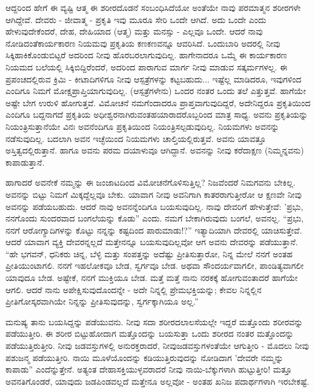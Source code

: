 ಆದ್ದರಿಂದ ಹೇಗೆ ಈ ವ್ಯಷ್ಟಿ ಆತ್ಮ ಈ ಶರೀರದೊಡನೆ ಸಂಬಂಧಿಸಿದೆಯೋ ಅಂತೆಯೇ ನಾವು ಪರಮಾತ್ಮನ ಶರೀರಗಳೇ ಆಗಿದ್ದೇವೆ. ದೇವರು - ಜೀವಾತ್ಮ - ಪ್ರಕೃತಿ ಇವು ಮೂರೂ ಸೇರಿ ಒಂದೇ ಆಗಿದೆ. ಅದು ಒಂದೇ ಎಂದು ಹೇಳುವುದೇಕೆಂದರೆ, ದೇಹ, ದೇಹಿಯಾದ (ಆತ್ಮ) ಮತ್ತು ಮನಸ್ಸು - ಎಲ್ಲವೂ ಒಂದೇ. ಆದರೆ ನಾವು ನೋಡಿದಂತೆ\break ಕಾರ್ಯಕಾರಣ ನಿಯಮವು ಪ್ರಕೃತಿಯ ಕಣಕಣವನ್ನೂ ಆವರಿಸಿದೆ. ಒಂದುಬಾರಿ ಅದರಲ್ಲಿ ನೀವು ಸಿಕ್ಕಿಹಾಕಿಕೊಂಡುಬಿಟ್ಟರೆ ಅದರಿಂದ ನೀವು ಹೊರಬರಲಾಗುವುದಿಲ್ಲ. ಹಾಗೇನಾದರೂ ಒಮ್ಮೆ ಈ ಕಾರ್ಯಕಾರಣ ನಿಯಮದ ಬಲೆಯಲ್ಲಿ ಸಿಕ್ಕಿಬಿದ್ದಿರೆಂದರೆ, ಅದರಿಂದ ಪಾರಾಗುವ ಮಾರ್ಗ ನೀವು ಮಾಡುವ ಸತ್ಕರ್ಮಗಳಲ್ಲ. ಈ ಪ್ರಪಂಚದಲ್ಲಿರುವ ಕ್ರಿಮಿ - ಕೀಟಾದಿಗಳಿಗೂ ನೀವು ಆಸ್ಪತ್ರೆಗಳನ್ನು ಕಟ್ಟಬಹುದು... ಇಷ್ಟೆಲ್ಲ ಮಾಡಿದರೂ, ಇವುಗಳಿಂದ ಎಂದಿಗೂ ನಿಮಗೆ ಮೋಕ್ಷಪ್ರಾಪ್ತಿಯಾಗುವುದಿಲ್ಲ. (ಆಸ್ಪತ್ರೆಗಳೇನು) ಒಂದರ ನಂತರ ಒಂದು ತಲೆ ಎತ್ತುತ್ತವೆ. ಹಾಗೆಯೇ ಅಷ್ಟೇ ಬೇಗ ಉರುಳಿ ಹೋಗುತ್ತವೆ. ವಿಮೋಚನೆ ನಮಗೆಂದಾದರೂ ಪ್ರಾಪ್ತವಾಗುವುದಿದ್ದರೆ, ಅದೇನಿದ್ದರೂ ಪ್ರಕೃತಿಯಿಂದ ಎಂದಿಗೂ ಬದ್ದನಾಗದೆ ಪ್ರಕೃತಿಯ ಅಧೀಶ್ವರನಾಗಿರುವಂತಹ\break ಯಾರಾದರೊಬ್ಬರಿಂದ ಮಾತ್ರ ಸಾಧ್ಯ. ಅವನು ಪ್ರಕೃತಿಯನ್ನು ನಿಯಂತ್ರಿಸುತ್ತಾನೆಯೇ ವಿನಃ ಅವನೆಂದಿಗೂ ಪ್ರಕೃತಿಯಿಂದ ನಿಯಂತ್ರಿಸಲ್ಪಡುವುದಿಲ್ಲ. ನಿಯಮಗಳು ಅವನನ್ನು ನಡೆಸುವುದಿಲ್ಲ. ಬದಲಾಗಿ ಅವನ ಇಚ್ಛೆಯಿಂದ ನಿಯಮಗಳು ಚಾಲ್ತಿಯಲ್ಲಿರುತ್ತವೆ. ಅವನು ಯಾವತ್ತೂ ಅಸ್ತಿತ್ವದಲ್ಲಿರುತ್ತಾನೆ. ಹಾಗೂ ಅವನು ಪರಮ ದಯಾಳುವೂ ಆಗಿದ್ದಾನೆ. ಅವನನ್ನು ನೀವು ಕರೆದಾಕ್ಷಣ (ನಿಮ್ಮನ್ನವನು) ಕಾಪಾಡುತ್ತಾನೆ.

ಹಾಗಾದರೆ ಅವನೇಕೆ ನಮ್ಮನ್ನು ಈ ಜಂಜಾಟದಿಂದ ವಿಮೋಚನೆಗೊಳಿಸುತ್ತಿಲ್ಲ? ನಿಜವೆಂದರೆ ನಿಮಗವನು ಬೇಕಿಲ್ಲ. ಅವನನ್ನು ಬಿಟ್ಟು ನಿಮಗೆ ಮಿಕ್ಕದ್ದೆಲ್ಲವೂ ಬೇಕು. ಯಾವಾಗ ನೀವು ಅವನಿಗಾಗಿ ಕಾತರರಾಗುತ್ತೀರೋ ಆ ಕ್ಷಣವೇ ನೀವು ಅವನನ್ನು ಪಡೆಯಬಹುದು. ಆದರೆ ನಾವು ಅವನನ್ನೆಂದಿಗೂ ಬಯಸುವುದಿಲ್ಲ. ನಾವು ದೇವರಿಗೆ ಹೇಳುತ್ತೇವೆ: 'ಪ್ರಭು, ನನಗೊಂದು ಸುಂದರವಾದ ಬಂಗಲೆಯನ್ನು ಕೊಡು” ಎಂದು. ನಮಗೆ ಬೇಕಾಗಿರುವುದು ಬಂಗಲೆ, ಅವನಲ್ಲ. “ಪ್ರಭು, ನನಗೆ ಆರೋಗ್ಯಾದಿಗಳನ್ನು ಕೊಟ್ಟು ನನ್ನನ್ನು ಕಷ್ಟದಿಂದ ಪಾರುಮಾಡು!?” ಇತ್ಯಾದಿಯಾಗಿ ದೇವರಲ್ಲಿ ಯಾಚಿಸುತ್ತೇವೆ. ಆದರೆ ಯಾವಾಗ ವ್ಯಕ್ತಿ ದೇವರನ್ನಲ್ಲದೆ ಮತ್ತೇನನ್ನೂ ಬಯಸುವುದಿಲ್ಲವೋ ಆಗ ಅವನು ದೇವರನ್ನು ಪಡೆಯುತ್ತಾನೆ. “ಹೇ ಭಗವನ್, ಧನಿಕರು ಚಿನ್ನ, ಬೆಳ್ಳಿ ಮತ್ತು ಸಂಪತ್ತನ್ನು ಅದೆಷ್ಟು ಪ್ರೀತಿಸುತ್ತಾರೋ, ನಿನ್ನ ಮೇಲೆ ನನಗೆ ಅಂತಹ ಪ್ರೀತಿಯುಂಟಾಗಲಿ. ನನಗೆ ಇಹಲೋಕವೂ ಬೇಡ, ಸ್ವರ್ಗವೂ ಬೇಡ. ಅಥವಾ ಸೌಂದರ್ಯವಾಗಲೀ, ಪಾಂಡಿತ್ಯವಾಗಲೀ ಯಾವುದೂ ಬೇಡ. ಅಷ್ಟೇಕೆ, ನನಗೆ ಮುಕ್ತಿಯೂ ಬೇಡ. ಮತ್ತೆ ಮತ್ತೆ ನಾನು ನರಕಕ್ಕೆ ಹೋಗುವಂತಾದರೆ ಹಾಗೆಯೇ ಆಗಲಿ. ಆದರೆ ನಾನು ಅಪೇಕ್ಷಿಸುವುದೊಂದನ್ನೇ - ಅದೇ ನಿನ್ನಲ್ಲಿ ಪ್ರೇಮಭಕ್ತಿಯನ್ನು; ಕೇವಲ ನಿನ್ನಲ್ಲಿನ ಪ್ರೀತಿಗೋಸ್ಕರವಾಗಿಯೇ ನಿನ್ನನ್ನು ಪ್ರೀತಿಸುವುದನ್ನು, ಸ್ವರ್ಗಕ್ಕಾಗಿಯೂ ಅಲ್ಲ.''

ಮನುಷ್ಯ ತಾನು ಬಯಸಿದ್ದನ್ನು ಪಡೆಯುವನು. ನೀವು ಸದಾ ಶರೀರದ\break ಲಾಲಸೆಯಲ್ಲೇ ಇದ್ದರೆ ಮತ್ತೊಂದು ಶರೀರವನ್ನು ಪಡೆಯುತ್ತೀರಿ. ಈ ಶರೀರ ಬಿಟ್ಟುಹೋದಾಗ ಮತ್ತೊಂದನ್ನು ಬಯಸುತ್ತಾ ಒಂದು ಶರೀರದ ನಂತರ ಮತ್ತೊಂದನ್ನು ಪಡೆಯುತ್ತಿರುತ್ತೀರಿ. ನೀವು ಜಡವಸ್ತುಗಳಲ್ಲಿ ಅನುರಕ್ತರಾದರೆ, ನೀವು\break ಜಡವಸ್ತುಗಳಂತೆಯೇ ಆಗುತ್ತೀರಿ - ಮೊದಲು ನೀವು ಪಶುಜನ್ಮ ಪಡೆಯುತ್ತೀರಿ. ನಾಯಿ ಮೂಳೆಯೊಂದನ್ನು ಕಡಿಯುತ್ತಿರುವುದನ್ನು ನೋಡಿದಾಗ 'ದೇವರೇ ನಮ್ಮನ್ನು ಕಾಪಾಡು'' ಎಂದೆನ್ನುತ್ತೇನೆ. ಅತ್ಯಂತ ದೇಹಾಸಕ್ತಿಯುಳ್ಳವರಾದರೆ ನೀವು ನಾಯಿ-ಬೆಕ್ಕುಗಳಾಗಿ ಹುಟ್ಟುತ್ತೀರಿ! ಮತ್ತೂ ಅವನತಿಗೊಂಡರೆ, ಯಾವುದು ಜಡಪಿಂಡವಲ್ಲದೆ ಮತ್ತೇನೂ ಅಲ್ಲವೋ - ಅಂತಹ ಖನಿಜ ಪದಾರ್ಥಗಳಾಗಿ ಇರಬೇಕಷ್ಟೆ.


